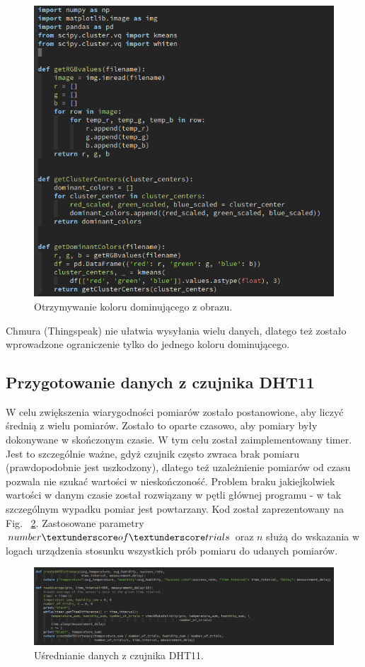 \documentclass{article}
\begin{document}
\begin{figure}
  \centering
  \includegraphics[scale = 1]{dominant.png}
  \caption{Otrzymywanie koloru dominującego z obrazu.} \label{fig:dom}    
\end{figure}

Chmura (Thingspeak) nie ułatwia wysyłania wielu danych, dlatego też zostało wprowadzone ograniczenie tylko do jednego koloru dominującego.

\subsection{Przygotowanie danych z czujnika DHT11}
W celu zwiększenia wiarygodności pomiarów zostało postanowione, aby liczyć średnią z wielu pomiarów. Zostało to oparte czasowo, aby pomiary były dokonywane w skończonym czasie. W tym celu został zaimplementowany timer. Jest to szczególnie ważne, gdyż czujnik często zwraca brak pomiaru (prawdopodobnie jest uszkodzony), dlatego też uzależnienie pomiarów od czasu pozwala nie szukać wartości w nieskończoność. Problem braku jakiejkolwiek wartości w danym czasie został rozwiązany w pętli głównej programu - w tak szczególnym wypadku pomiar jest powtarzany. Kod został zaprezentowany na Fig.~ \ref{fig:dht}. Zastosowane parametry $number\textunderscore of\textunderscore trials$ oraz $n$ służą do wskazania w logach urządzenia stosunku wszystkich prób pomiaru do udanych pomiarów.
\begin{figure}
  \centering
  \includegraphics[width=\textwidth]{dht.png}
  \caption{Uśrednianie danych z czujnika DHT11.} \label{fig:dht}    
\end{figure}
\end{document}
